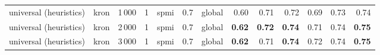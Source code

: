 \begin{tabular}{lllllllrrrrrr}
universal (heuristics) & kron & 1\,000 & 1     & spmi  & 0.7 & global &                 0.60  &                  0.71  &                   0.72  &                    0.69  &                     0.73  &                0.74  \\
universal (heuristics) & kron & 2\,000 & 1     & spmi  & 0.7 & global &         \textbf{0.62} &          \textbf{0.72} &           \textbf{0.74} &                    0.71  &                     0.74  &        \textbf{0.75} \\
universal (heuristics) & kron & 3\,000 & 1     & spmi  & 0.7 & global &         \textbf{0.62} &                  0.71  &           \textbf{0.74} &                    0.72  &                     0.74  &        \textbf{0.75} \\
\bottomrule
\end{tabular}
